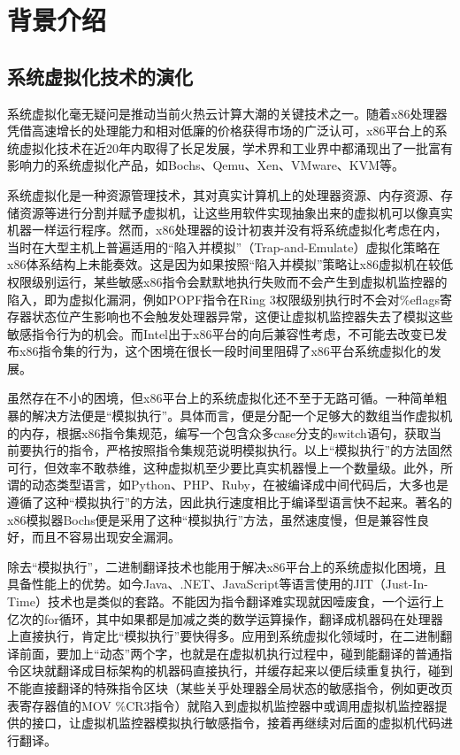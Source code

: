 
\chapter{背景介绍}
\label{chap:background}

\section{系统虚拟化技术的演化}

系统虚拟化毫无疑问是推动当前火热云计算大潮的关键技术之一。随着x86处理器凭借高速增长的处理能力和相对低廉的价格获得市场的广泛认可，x86平台上的系统虚拟化技术在近20年内取得了长足发展，学术界和工业界中都涌现出了一批富有影响力的系统虚拟化产品，如Bochs、Qemu、Xen、VMware、KVM等。

系统虚拟化是一种资源管理技术，其对真实计算机上的处理器资源、内存资源、存储资源等进行分割并赋予虚拟机，让这些用软件实现抽象出来的虚拟机可以像真实机器一样运行程序。然而，x86处理器的设计初衷并没有将系统虚拟化考虑在内，当时在大型主机上普遍适用的``陷入并模拟''（Trap-and-Emulate）虚拟化策略在x86体系结构上未能奏效。这是因为如果按照``陷入并模拟''策略让x86虚拟机在较低权限级别运行，某些敏感x86指令会默默地执行失败而不会产生到虚拟机监控器的陷入，即为虚拟化漏洞，例如POPF指令在Ring 3权限级别执行时不会对\%eflags寄存器状态位产生影响也不会触发处理器异常，这便让虚拟机监控器失去了模拟这些敏感指令行为的机会。而Intel出于x86平台的向后兼容性考虑，不可能去改变已发布x86指令集的行为，这个困境在很长一段时间里阻碍了x86平台系统虚拟化的发展。

虽然存在不小的困境，但x86平台上的系统虚拟化还不至于无路可循。一种简单粗暴的解决方法便是``模拟执行''。具体而言，便是分配一个足够大的数组当作虚拟机的内存，根据x86指令集规范，编写一个包含众多case分支的switch语句，获取当前要执行的指令，严格按照指令集规范说明模拟执行。以上``模拟执行''的方法固然可行，但效率不敢恭维，这种虚拟机至少要比真实机器慢上一个数量级。此外，所谓的动态类型语言，如Python、PHP、Ruby，在被编译成中间代码后，大多也是遵循了这种``模拟执行''的方法，因此执行速度相比于编译型语言快不起来。著名的x86模拟器Bochs便是采用了这种``模拟执行''方法，虽然速度慢，但是兼容性良好，而且不容易出现安全漏洞。

除去``模拟执行''，二进制翻译技术也能用于解决x86平台上的系统虚拟化困境，且具备性能上的优势。如今Java、.NET、JavaScript等语言使用的JIT（Just-In-Time）技术也是类似的套路。不能因为指令翻译难实现就因噎废食，一个运行上亿次的for循环，其中如果都是加减之类的数学运算操作，翻译成机器码在处理器上直接执行，肯定比``模拟执行''要快得多。应用到系统虚拟化领域时，在二进制翻译前面，要加上``动态''两个字，也就是在虚拟机执行过程中，碰到能翻译的普通指令区块就翻译成目标架构的机器码直接执行，并缓存起来以便后续重复执行，碰到不能直接翻译的特殊指令区块（某些关乎处理器全局状态的敏感指令，例如更改页表寄存器值的MOV \%CR3指令）就陷入到虚拟机监控器中或调用虚拟机监控器提供的接口，让虚拟机监控器模拟执行敏感指令，接着再继续对后面的虚拟机代码进行翻译。

